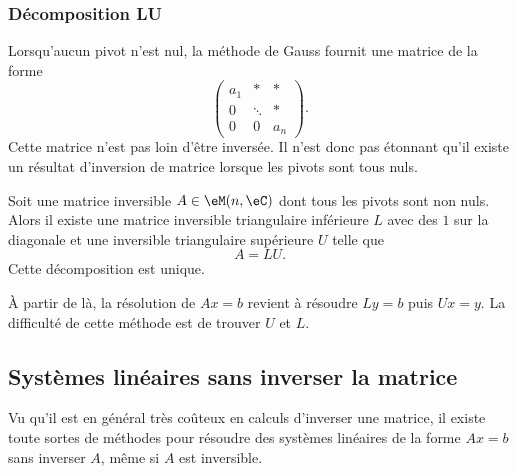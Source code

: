 \subsubsection{Décomposition LU}

Lorsqu'aucun pivot n'est nul, la méthode de Gauss fournit une matrice de la forme
\begin{equation}
    \begin{pmatrix}
        a_1    &   *    &   *    \\
        0    &   \ddots    &   *    \\
        0    &   0    &   a_n
    \end{pmatrix}.
\end{equation}
Cette matrice n'est pas loin d'être inversée. Il n'est donc pas étonnant qu'il existe un résultat d'inversion de matrice lorsque les pivots sont tous nuls.

\begin{theorem}
    Soit une matrice inversible \( A\in \eM(n,\eC)\) dont tous les pivots sont non nuls. Alors il existe une matrice inversible triangulaire inférieure \( L\) avec des \( 1\) sur la diagonale et une inversible triangulaire supérieure \( U\) telle que
    \begin{equation}
        A=LU.
    \end{equation}
    Cette décomposition est unique.
\end{theorem}

À partir de là, la résolution de \( Ax=b\) revient à résoudre \( Ly=b\) puis \( Ux=y\). La difficulté de cette méthode est de trouver \( U\) et \( L\).

\subsection{Systèmes linéaires sans inverser la matrice}

Vu qu'il est en général très coûteux en calculs d'inverser une matrice, il existe toute sortes de méthodes pour résoudre des systèmes linéaires de la forme \( Ax=b\) sans inverser \( A\), même si \( A\) est inversible.

